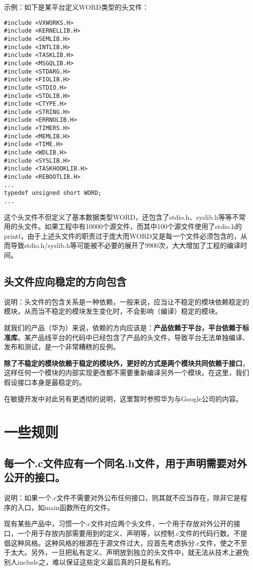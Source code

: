 示例：如下是某平台定义WORD类型的头文件：
\begin{verbatim}
#include <VXWORKS.H>
#include <KERNELLIB.H>
#include <SEMLIB.H>
#include <INTLIB.H>
#include <TASKLIB.H>
#include <MSGQLIB.H>
#include <STDARG.H>
#include <FIOLIB.H>
#include <STDIO.H>
#include <STDLIB.H>
#include <CTYPE.H>
#include <STRING.H>
#include <ERRNOLIB.H>
#include <TIMERS.H>
#include <MEMLIB.H>
#include <TIME.H>
#include <WDLIB.H>
#include <SYSLIB.H>
#include <TASKHOOKLIB.H>
#include <REBOOTLIB.H>
...
typedef unsigned short WORD;
...
\end{verbatim}
这个头文件不但定义了基本数据类型WORD，还包含了stdio.h、syslib.h等等不常用的头文件。如果工程中有10000个源文件，而其中100个源文件使用了stdio.h的printf，由于上述头文件的职责过于庞大而WORD又是每一个文件必须包含的，从而导致stdio.h/syslib.h等可能被不必要的展开了9900次，大大增加了工程的编译时间。


\subsection{头文件应向稳定的方向包含}
说明：头文件的包含关系是一种依赖，一般来说，应当让不稳定的模块依赖稳定的模块，从而当不稳定的模块发生变化时，不会影响（编译）稳定的模块。

就我们的产品（华为）来说，依赖的方向应该是：\textbf{产品依赖于平台，平台依赖于标准库}。某产品线平台的代码中已经包含了产品的头文件，导致平台无法单独编译、发布和测试，是一个非常糟糕的反例。

\textbf{除了不稳定的模块依赖于稳定的模块外，更好的方式是两个模块共同依赖于接口}，这样任何一个模块的内部实现更改都不需要重新编译另外一个模块。在这里，我们假设接口本身是最稳定的。

在敏捷开发中对此另有更透彻的说明，这里暂时参照华为与Google公司的内容。


\section{一些规则}

\subsection{每一个.c文件应有一个同名.h文件，用于声明需要对外公开的接口。}
说明：如果一个.c文件不需要对外公布任何接口，则其就不应当存在，除非它是程序的入口，如main函数所在的文件。

现有某些产品中，习惯一个.c文件对应两个头文件，一个用于存放对外公开的接口，一个用于存放内部需要用到的定义、声明等，以控制.c文件的代码行数。不提倡这种风格。这种风格的根源在于源文件过大，应首先考虑拆分.c文件，使之不至于太大。另外，一旦把私有定义、声明放到独立的头文件中，就无法从技术上避免别人include之，难以保证这些定义最后真的只是私有的。

